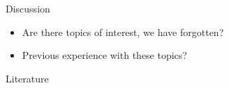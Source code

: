 \documentclass[aspectratio=169,graphics,handout]{beamer}
\begin{document}
\begin{frame}{Discussion}
    \begin{itemize}
        \item Are there topics of interest, we have forgotten?
        \item Previous experience with these topics?
    \end{itemize}
\end{frame}

\begin{frame}[t,allowframebreaks]{Literature}
    \printbibliography{}
\end{frame}

\end{document}
